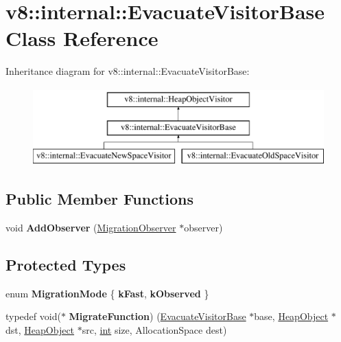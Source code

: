 \hypertarget{classv8_1_1internal_1_1EvacuateVisitorBase}{}\section{v8\+:\+:internal\+:\+:Evacuate\+Visitor\+Base Class Reference}
\label{classv8_1_1internal_1_1EvacuateVisitorBase}
Inheritance diagram for v8\+:\+:internal\+:\+:Evacuate\+Visitor\+Base\+:\begin{figure}[H]
\begin{center}
\leavevmode
\includegraphics[height=3.000000cm]{classv8_1_1internal_1_1EvacuateVisitorBase}
\end{center}
\end{figure}
\subsection*{Public Member Functions}
\begin{DoxyCompactItemize}
\item 
\mbox{\label{classv8_1_1internal_1_1EvacuateVisitorBase_a9e08b20159fa7ad1617e50bb2ca66be2}} 
void {\bfseries Add\+Observer} (\mbox{\hyperlink{classv8_1_1internal_1_1MigrationObserver}{Migration\+Observer}} $\ast$observer)
\end{DoxyCompactItemize}
\subsection*{Protected Types}
\begin{DoxyCompactItemize}
\item 
\mbox{\label{classv8_1_1internal_1_1EvacuateVisitorBase_ae9ded849599f0cf5c83e5cd69d290cb2}} 
enum {\bfseries Migration\+Mode} \{ {\bfseries k\+Fast}, 
{\bfseries k\+Observed}
 \}
\item 
\mbox{\label{classv8_1_1internal_1_1EvacuateVisitorBase_a332ee0d6a5bd76ddcdb560e5e06aa14f}} 
typedef void($\ast$ {\bfseries Migrate\+Function}) (\mbox{\hyperlink{classv8_1_1internal_1_1EvacuateVisitorBase}{Evacuate\+Visitor\+Base}} $\ast$base, \mbox{\hyperlink{classv8_1_1internal_1_1HeapObject}{Heap\+Object}} $\ast$dst, \mbox{\hyperlink{classv8_1_1internal_1_1HeapObject}{Heap\+Object}} $\ast$src, \mbox{\hyperlink{classint}{int}} size, Allocation\+Space dest)
\end{DoxyCompactItemize}
